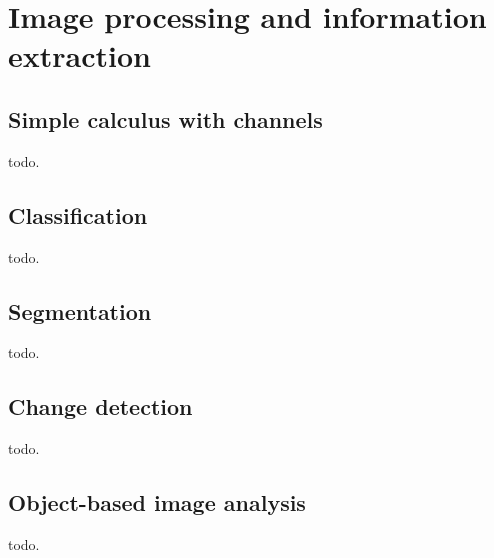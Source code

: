 \section{Image processing and information extraction}\label{sec:improc}

\subsection{Simple calculus with channels}\label{ssec:calculus}

todo.

\subsection{Classification}\label{ssec:classification}

todo.

\subsection{Segmentation}\label{ssec:segmentation}

todo.

\subsection{Change detection}\label{ssec:changedetection}

todo.

\subsection{Object-based image analysis}\label{ssec:obia}

todo.
